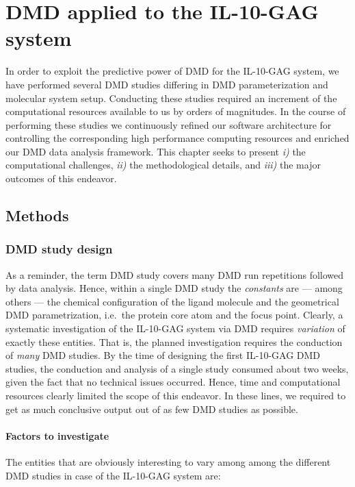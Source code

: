 \chapter{DMD applied to the IL-10-GAG system}

In order to exploit the predictive power of DMD for the IL-10-GAG system, we
have performed several DMD studies differing in DMD parameterization and
molecular system setup. Conducting these studies required an increment of the
computational resources available to us by orders of magnitudes. In the course
of performing these studies we continuously refined our software architecture
for controlling the corresponding high performance computing resources and
enriched our DMD data analysis framework. This chapter seeks to present
\textit{i)} the computational challenges, \textit{ii)} the methodological
details, and \textit{iii)} the major outcomes of this endeavor.


\section{Methods}

\subsection{DMD study design}

As a reminder, the term DMD study covers many DMD run repetitions followed by
data analysis. Hence, within a single DMD study the \textit{constants} are ---
among others --- the chemical configuration of the ligand molecule and the
geometrical DMD parametrization, i.e.\ the protein core atom and the focus
point. Clearly, a systematic investigation of the IL-10-GAG system via DMD
requires \textit{variation} of exactly these entities. That is, the planned
investigation requires the conduction of \textit{many} DMD studies. By the time
of designing the first IL-10-GAG DMD studies, the conduction and analysis of a
single study consumed about two weeks, given the fact that no technical issues
occurred. Hence, time and computational resources clearly limited the scope of
this endeavor. In these lines, we required to get as much conclusive output out
of as few DMD studies as possible.

\subsubsection{Factors to investigate}

The entities that are obviously interesting to vary among among the different
DMD studies in case of the IL-10-GAG system are:

